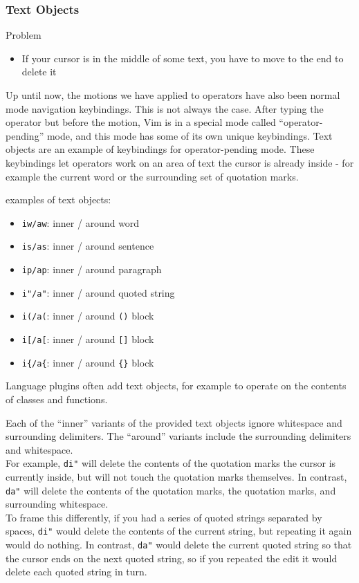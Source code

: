 \documentclass{beamer}
\begin{document}
\begin{frame}[fragile]
    \frametitle{Text Objects}
    \begin{block}{Problem}
	\begin{itemize}
	    \item If your cursor is in the middle of some text, you have to move to the end to delete it
	\end{itemize}
    \end{block}
    Up until now, the motions we have applied to operators have also been normal mode navigation keybindings. This is not always the case. After typing the operator but before the motion, Vim is in a special mode called \enquote{operator-pending} mode, and this mode has some of its own unique keybindings. Text objects are an example of keybindings for operator-pending mode. These keybindings let operators work on an area of text the cursor is already inside - for example the current word or the surrounding set of quotation marks.
\end{frame}

\begin{frame}[fragile]
    examples of text objects:
    \begin{itemize}
	\item \verb+iw/aw+: inner / around word
	\item \verb+is/as+: inner / around sentence
	\item \verb+ip/ap+: inner / around paragraph
	\item \verb+i"/a"+: inner / around quoted string
	\item \verb+i(/a(+: inner / around \verb+()+ block
	\item \verb+i[/a[+: inner / around \verb+[]+ block
	\item \verb+i{/a{+: inner / around \verb+{}+ block
    \end{itemize}
    Language plugins often add text objects, for example to operate on the contents of classes and functions.
\end{frame}

\begin{frame}[fragile]
    Each of the \enquote{inner} variants of the provided text objects ignore whitespace and surrounding delimiters. The \enquote{around} variants include the surrounding delimiters and whitespace. \\
    \vspace{0.5cm}
    For example, \verb+di"+ will delete the contents of the quotation marks the cursor is currently inside, but will not touch the quotation marks themselves. In contrast, \verb+da"+ will delete the contents of the quotation marks, the quotation marks, and surrounding whitespace. \\
    \vspace{0.5cm}
    To frame this differently, if you had a series of quoted strings separated by spaces, \verb+di"+ would delete the contents of the current string, but repeating it again would do nothing. In contrast, \verb+da"+ would delete the current quoted string so that the cursor ends on the next quoted string, so if you repeated the edit it would delete each quoted string in turn.
\end{frame}
\end{document}
